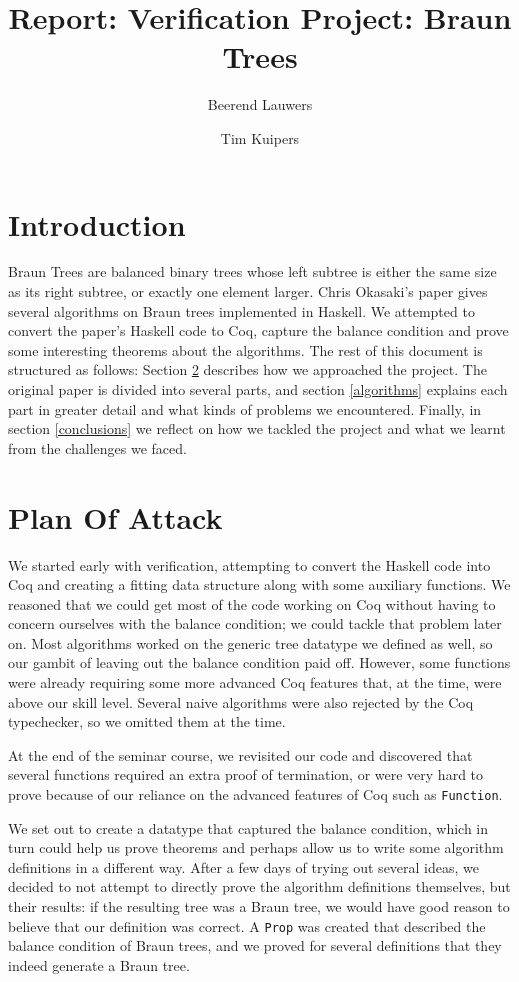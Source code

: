 \documentclass[a4paper,10pt]{article}
\title{Report: Verification Project: Braun Trees}
\author{Beerend Lauwers \and Tim Kuipers}
\begin{document}
\maketitle

\section{Introduction}
Braun Trees are balanced binary trees whose left subtree is either the same size as its right subtree, or exactly one element larger.
Chris Okasaki's paper \cite{DBLP:journals/jfp/Okasaki97} gives several algorithms on Braun trees implemented in Haskell.
We attempted to convert the paper's Haskell code to Coq, capture the balance condition and prove some interesting theorems about the algorithms.
The rest of this document is structured as follows:
Section \ref{poa} describes how we approached the project.
The original paper is divided into several parts, and section \ref{algorithms} explains each part in greater detail and what kinds of problems we encountered.
Finally, in section \ref{conclusions} we reflect on how we tackled the project and what we learnt from the challenges we faced.

\section{Plan Of Attack}\label{poa}
We started early with verification, attempting to convert the Haskell code into Coq and creating a fitting data structure along with some auxiliary functions.
We reasoned that we could get most of the code working on Coq without having to concern ourselves with the balance condition; we could tackle that problem later on.
Most algorithms worked on the generic tree datatype we defined as well, so our gambit of leaving out the balance condition paid off.
However, some functions were already requiring some more advanced Coq features that, at the time, were above our skill level.
Several naive algorithms were also rejected by the Coq typechecker, so we omitted them at the time.

At the end of the seminar course, we revisited our code and discovered that several functions required an extra proof of termination, or were very hard to prove because of our reliance on the advanced features of Coq such as \texttt{Function}.

We set out to create a datatype that captured the balance condition, which in turn could help us prove theorems and perhaps allow us to write some algorithm definitions in a different way.
After a few days of trying out several ideas, we decided to not attempt to directly prove the algorithm definitions themselves, but their results: if the resulting tree was a Braun tree, we would have good reason to believe that our definition was correct.
A \texttt{Prop} was created that described the balance condition of Braun trees, and we proved for several definitions that they indeed generate a Braun tree.
\end{document}
